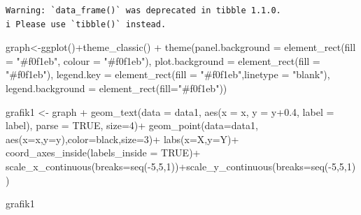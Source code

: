 \documentclass[
  letterpaper,
  DIV=11,
  numbers=noendperiod]{scrartcl}
\newenvironment{Shaded}{\begin{snugshade}}{\end{snugshade}}
\newcommand{\AttributeTok}[1]{\textcolor[rgb]{0.40,0.45,0.13}{#1}}
\newcommand{\ConstantTok}[1]{\textcolor[rgb]{0.56,0.35,0.01}{#1}}
\newcommand{\DecValTok}[1]{\textcolor[rgb]{0.68,0.00,0.00}{#1}}
\newcommand{\FloatTok}[1]{\textcolor[rgb]{0.68,0.00,0.00}{#1}}
\newcommand{\FunctionTok}[1]{\textcolor[rgb]{0.28,0.35,0.67}{#1}}
\newcommand{\NormalTok}[1]{\textcolor[rgb]{0.00,0.23,0.31}{#1}}
\newcommand{\OtherTok}[1]{\textcolor[rgb]{0.00,0.23,0.31}{#1}}
\newcommand{\SpecialCharTok}[1]{\textcolor[rgb]{0.37,0.37,0.37}{#1}}
\newcommand{\StringTok}[1]{\textcolor[rgb]{0.13,0.47,0.30}{#1}}
\begin{document}
\begin{verbatim}
Warning: `data_frame()` was deprecated in tibble 1.1.0.
i Please use `tibble()` instead.
\end{verbatim}

\begin{Shaded}
\begin{Highlighting}[]
\NormalTok{graph}\OtherTok{\textless{}{-}}\FunctionTok{ggplot}\NormalTok{()}\SpecialCharTok{+}\FunctionTok{theme\_classic}\NormalTok{() }\SpecialCharTok{+}
  \FunctionTok{theme}\NormalTok{(}\AttributeTok{panel.background =} \FunctionTok{element\_rect}\NormalTok{(}\AttributeTok{fill =} \StringTok{"\#f0f1eb"}\NormalTok{,}
                                        \AttributeTok{colour =} \StringTok{"\#f0f1eb"}\NormalTok{),}
        \AttributeTok{plot.background =} \FunctionTok{element\_rect}\NormalTok{(}\AttributeTok{fill =} \StringTok{"\#f0f1eb"}\NormalTok{),}
        \AttributeTok{legend.key =} \FunctionTok{element\_rect}\NormalTok{(}\AttributeTok{fill =} \StringTok{"\#f0f1eb"}\NormalTok{,}\AttributeTok{linetype =} \StringTok{"blank"}\NormalTok{),}
        \AttributeTok{legend.background =} \FunctionTok{element\_rect}\NormalTok{(}\AttributeTok{fill=}\StringTok{"\#f0f1eb"}\NormalTok{))}

\NormalTok{grafik1 }\OtherTok{\textless{}{-}}\NormalTok{ graph }\SpecialCharTok{+}
  \FunctionTok{geom\_text}\NormalTok{(}\AttributeTok{data =}\NormalTok{ data1,}
            \FunctionTok{aes}\NormalTok{(}\AttributeTok{x =}\NormalTok{ x, }\AttributeTok{y =}\NormalTok{ y}\FloatTok{+0.4}\NormalTok{, }\AttributeTok{label =}\NormalTok{ label), }\AttributeTok{parse =} \ConstantTok{TRUE}\NormalTok{,}
            \AttributeTok{size=}\DecValTok{4}\NormalTok{)}\SpecialCharTok{+}
  \FunctionTok{geom\_point}\NormalTok{(}\AttributeTok{data=}\NormalTok{data1,}
             \FunctionTok{aes}\NormalTok{(}\AttributeTok{x=}\NormalTok{x,}\AttributeTok{y=}\NormalTok{y),}\AttributeTok{color=}\StringTok{\textquotesingle{}black\textquotesingle{}}\NormalTok{,}\AttributeTok{size=}\DecValTok{3}\NormalTok{)}\SpecialCharTok{+}
  \FunctionTok{labs}\NormalTok{(}\AttributeTok{x=}\StringTok{\textquotesingle{}X\textquotesingle{}}\NormalTok{,}\AttributeTok{y=}\StringTok{\textquotesingle{}Y\textquotesingle{}}\NormalTok{)}\SpecialCharTok{+}
  \FunctionTok{coord\_axes\_inside}\NormalTok{(}\AttributeTok{labels\_inside =} \ConstantTok{TRUE}\NormalTok{)}\SpecialCharTok{+}
  \FunctionTok{scale\_x\_continuous}\NormalTok{(}\AttributeTok{breaks=}\FunctionTok{seq}\NormalTok{(}\SpecialCharTok{{-}}\DecValTok{5}\NormalTok{,}\DecValTok{5}\NormalTok{,}\DecValTok{1}\NormalTok{))}\SpecialCharTok{+}\FunctionTok{scale\_y\_continuous}\NormalTok{(}\AttributeTok{breaks=}\FunctionTok{seq}\NormalTok{(}\SpecialCharTok{{-}}\DecValTok{5}\NormalTok{,}\DecValTok{5}\NormalTok{,}\DecValTok{1}\NormalTok{))}

\NormalTok{grafik1}
\end{Highlighting}
\end{Shaded}
\end{document}
